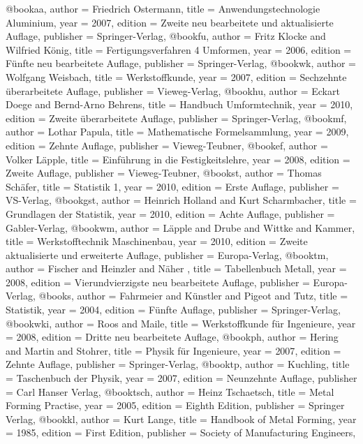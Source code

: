                   @book{aa,
author = {Friedrich Ostermann},
title = {Anwendungstechnologie Aluminium},
year = {2007},
edition = {Zweite neu bearbeitete und aktualisierte Auflage},
publisher = {Springer-Verlag},
}
@book{fu,
author = {Fritz Klocke and Wilfried König},
title = {Fertigungsverfahren 4 Umformen},
year = {2006},
edition = {Fünfte neu bearbeitete Auflage},
publisher = {Springer-Verlag},
}
@book{wk,
author = {Wolfgang Weisbach},
title = {Werkstoffkunde},
year = {2007},
edition = {Sechzehnte überarbeitete Auflage},
publisher = {Vieweg-Verlag},
}
@book{hu,
author = {Eckart Doege and Bernd-Arno Behrens},
title = {Handbuch Umformtechnik},
year = {2010},
edition = {Zweite überarbeitete Auflage},
publisher = {Springer-Verlag},
}
@book{mf,
author = {Lothar Papula},
title = {Mathematische Formelsammlung},
year = {2009},
edition = {Zehnte Auflage},
publisher = {Vieweg-Teubner},
}
@book{ef,
author = {Volker Läpple},
title = {Einführung in die Festigkeitslehre},
year = {2008},
edition = {Zweite Auflage},
publisher = {Vieweg-Teubner},
}
@book{st,
author = {Thomas Schäfer},
title = {Statistik 1},
year = {2010},
edition = {Erste Auflage},
publisher = {VS-Verlag},
}
@book{gst,
author = {Heinrich Holland and Kurt Scharmbacher},
title = {Grundlagen der Statistik},
year = {2010},
edition = {Achte Auflage},
publisher = {Gabler-Verlag},
}
@book{wm,
author = {Läpple and Drube and Wittke and Kammer},
title = {Werkstofftechnik Maschinenbau},
year = {2010},
edition = {Zweite aktualisierte und erweiterte Auflage},
publisher = {Europa-Verlag},
}
@book{tm,
author = {Fischer and Heinzler and Näher },
title = {Tabellenbuch Metall},
year = {2008},
edition = {Vierundvierzigste neu bearbeitete Auflage},
publisher = {Europa-Verlag},
}
@book{s,
author = {Fahrmeier and Künstler and Pigeot and Tutz},
title = {Statistik},
year = {2004},
edition = {Fünfte Auflage},
publisher = {Springer-Verlag},
}
@book{wki,
author = {Roos and Maile},
title = {Werkstoffkunde für Ingenieure},
year = {2008},
edition = {Dritte neu bearbeitete Auflage},
}
@book{ph,
author = {Hering and Martin and Stohrer},
title = {Physik für Ingenieure},
year = {2007},
edition = {Zehnte Auflage},
publisher = {Springer-Verlag},
}
@book{tp,
author = {Kuchling},
title = {Taschenbuch der Physik},
year = {2007},
edition = {Neunzehnte Auflage},
publisher = {Carl Hanser Verlag},
}
@book{tsch,
author = {Heinz Tschaetsch},
title = {Metal Forming Practise},
year = {2005},
edition = {Eighth Edition},
publisher = {Springer Verlag},
}
@book{kl,
author = {Kurt Lange},
title = {Handbook of Metal Forming},
year = {1985},
edition = {First Edition},
publisher = {Society of Manufacturing Engineers},
}

